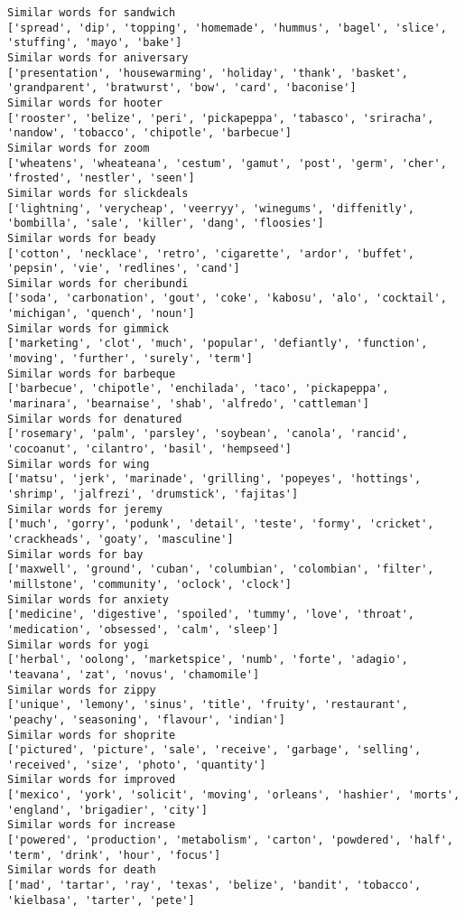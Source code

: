 \documentclass[11pt]{article}
\begin{document}
\begin{Verbatim}[commandchars=\\\{\}]
Similar words for sandwich
['spread', 'dip', 'topping', 'homemade', 'hummus', 'bagel', 'slice', 'stuffing', 'mayo', 'bake']
Similar words for aniversary
['presentation', 'housewarming', 'holiday', 'thank', 'basket', 'grandparent', 'bratwurst', 'bow', 'card', 'baconise']
Similar words for hooter
['rooster', 'belize', 'peri', 'pickapeppa', 'tabasco', 'sriracha', 'nandow', 'tobacco', 'chipotle', 'barbecue']
Similar words for zoom
['wheatens', 'wheateana', 'cestum', 'gamut', 'post', 'germ', 'cher', 'frosted', 'nestler', 'seen']
Similar words for slickdeals
['lightning', 'verycheap', 'veerryy', 'winegums', 'diffenitly', 'bombilla', 'sale', 'killer', 'dang', 'floosies']
Similar words for beady
['cotton', 'necklace', 'retro', 'cigarette', 'ardor', 'buffet', 'pepsin', 'vie', 'redlines', 'cand']
Similar words for cheribundi
['soda', 'carbonation', 'gout', 'coke', 'kabosu', 'alo', 'cocktail', 'michigan', 'quench', 'noun']
Similar words for gimmick
['marketing', 'clot', 'much', 'popular', 'defiantly', 'function', 'moving', 'further', 'surely', 'term']
Similar words for barbeque
['barbecue', 'chipotle', 'enchilada', 'taco', 'pickapeppa', 'marinara', 'bearnaise', 'shab', 'alfredo', 'cattleman']
Similar words for denatured
['rosemary', 'palm', 'parsley', 'soybean', 'canola', 'rancid', 'cocoanut', 'cilantro', 'basil', 'hempseed']
Similar words for wing
['matsu', 'jerk', 'marinade', 'grilling', 'popeyes', 'hottings', 'shrimp', 'jalfrezi', 'drumstick', 'fajitas']
Similar words for jeremy
['much', 'gorry', 'podunk', 'detail', 'teste', 'formy', 'cricket', 'crackheads', 'goaty', 'masculine']
Similar words for bay
['maxwell', 'ground', 'cuban', 'columbian', 'colombian', 'filter', 'millstone', 'community', 'oclock', 'clock']
Similar words for anxiety
['medicine', 'digestive', 'spoiled', 'tummy', 'love', 'throat', 'medication', 'obsessed', 'calm', 'sleep']
Similar words for yogi
['herbal', 'oolong', 'marketspice', 'numb', 'forte', 'adagio', 'teavana', 'zat', 'novus', 'chamomile']
Similar words for zippy
['unique', 'lemony', 'sinus', 'title', 'fruity', 'restaurant', 'peachy', 'seasoning', 'flavour', 'indian']
Similar words for shoprite
['pictured', 'picture', 'sale', 'receive', 'garbage', 'selling', 'received', 'size', 'photo', 'quantity']
Similar words for improved
['mexico', 'york', 'solicit', 'moving', 'orleans', 'hashier', 'morts', 'england', 'brigadier', 'city']
Similar words for increase
['powered', 'production', 'metabolism', 'carton', 'powdered', 'half', 'term', 'drink', 'hour', 'focus']
Similar words for death
['mad', 'tartar', 'ray', 'texas', 'belize', 'bandit', 'tobacco', 'kielbasa', 'tarter', 'pete']

\end{Verbatim}
\end{document}

